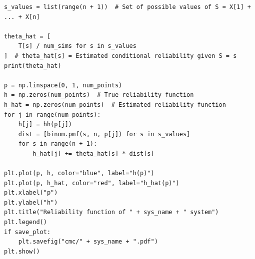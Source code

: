 \documentclass[12pt,
               a4paper,
               article,
               oneside,
               english,oldfontcommands]{memoir}
\begin{document}
\begin{lstlisting}[caption= Conditional Monte Carlo Reliability (exercise j.), label={lst:cond rel prob}]
s_values = list(range(n + 1))  # Set of possible values of S = X[1] + ... + X[n]

theta_hat = [
    T[s] / num_sims for s in s_values
]  # theta_hat[s] = Estimated conditional reliability given S = s
print(theta_hat)

p = np.linspace(0, 1, num_points)
h = np.zeros(num_points)  # True reliability function
h_hat = np.zeros(num_points)  # Estimated reliability function
for j in range(num_points):
    h[j] = hh(p[j])
    dist = [binom.pmf(s, n, p[j]) for s in s_values]
    for s in range(n + 1):
        h_hat[j] += theta_hat[s] * dist[s]

plt.plot(p, h, color="blue", label="h(p)")
plt.plot(p, h_hat, color="red", label="h_hat(p)")
plt.xlabel("p")
plt.ylabel("h")
plt.title("Reliability function of " + sys_name + " system")
plt.legend()
if save_plot:
    plt.savefig("cmc/" + sys_name + ".pdf")
plt.show()
\end{lstlisting} 
\end{document}
